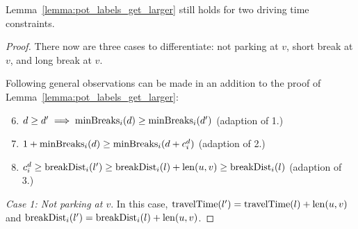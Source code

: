 \begin{lemma}\label{lemma:pot_labels_get_larger_n}
	Lemma~\ref{lemma:pot_labels_get_larger} still holds for two driving time constraints.
\end{lemma}

\begin{proof}
	There now are three cases to differentiate: not parking at $v$, short break at $v$, and long break at $v$.

	Following general observations can be made in an addition to the proof of Lemma~\ref{lemma:pot_labels_get_larger}:

	\begin{enumerate}
		\setcounter{enumi}{5}
		\item $d \ge d' \implies \operatorname{minBreaks}_i(d) \ge \operatorname{minBreaks}_i(d')$ (adaption of 1.)
		\item $1 + \operatorname{minBreaks}_i(d) \ge \operatorname{minBreaks}_i(d + c_i^d)$ (adaption of 2.)
		\item $c_i^d \ge \operatorname{breakDist}_i(l') \ge \operatorname{breakDist}_i(l) + \operatorname{len}(u,v) \ge \operatorname{breakDist}_i(l)$ (adaption of 3.)
	\end{enumerate}

	\emph{Case 1: Not parking at $v$}. In this case, $\operatorname{travelTime}(l') = \operatorname{travelTime}(l) + \operatorname{len}(u,v)$ and $\operatorname{breakDist}_i(l') = \operatorname{breakDist}_i(l) + \operatorname{len}(u,v)$.


\end{proof}
